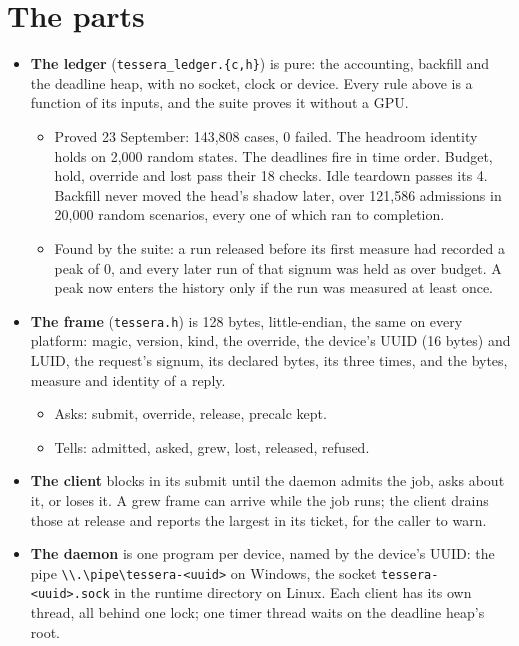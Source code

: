 \section{\texorpdfstring{The parts}{The parts}}

\begin{itemize}
\item \textbf{The ledger} (\texttt{tessera\_\allowbreak{}ledger.\allowbreak{}\{c,h\}}) is pure: the accounting, backfill and the deadline heap, with no socket, clock or device. Every rule above is a function of its inputs, and the suite proves it without a GPU.

\begin{itemize}
\item Proved 23 September: 143,808 cases, 0 failed. The headroom identity holds on 2,000 random states. The deadlines fire in time order. Budget, hold, override and lost pass their 18 checks. Idle teardown passes its 4. Backfill never moved the head's shadow later, over 121,586 admissions in 20,000 random scenarios, every one of which ran to completion.
\item Found by the suite: a run released before its first measure had recorded a peak of 0, and every later run of that signum was held as over budget. A peak now enters the history only if the run was measured at least once.
\end{itemize}
\item \textbf{The frame} (\texttt{tessera.\allowbreak{}h}) is 128 bytes, little-endian, the same on every platform: magic, version, kind, the override, the device's UUID (16 bytes) and LUID, the request's signum, its declared bytes, its three times, and the bytes, measure and identity of a reply.

\begin{itemize}
\item Asks: submit, override, release, precalc kept.
\item Tells: admitted, asked, grew, lost, released, refused.
\end{itemize}
\item \textbf{The client} blocks in its submit until the daemon admits the job, asks about it, or loses it. A grew frame can arrive while the job runs; the client drains those at release and reports the largest in its ticket, for the caller to warn.
\item \textbf{The daemon} is one program per device, named by the device's UUID: the pipe \texttt{\textbackslash{}\textbackslash{}.\allowbreak{}\textbackslash{}pipe\textbackslash{}tessera-\allowbreak{}<uuid>} on Windows, the socket \texttt{tessera-\allowbreak{}<uuid>.\allowbreak{}sock} in the runtime directory on Linux. Each client has its own thread, all behind one lock; one timer thread waits on the deadline heap's root.


\end{itemize}
